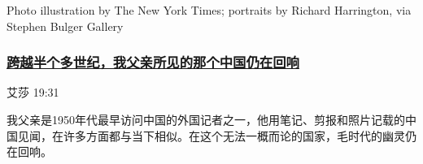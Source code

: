 \href{/china/20200731/china-1950s-echoed-today/}{}

Photo illustration by The New York Times; portraits by Richard
Harrington, via Stephen Bulger Gallery

\hypertarget{ux8de8ux8d8aux534aux4e2aux591aux4e16ux7eaaux6211ux7236ux4eb2ux6240ux89c1ux7684ux90a3ux4e2aux4e2dux56fdux4ecdux5728ux56deux54cd}{%
\subsubsection{\texorpdfstring{\href{/china/20200731/china-1950s-echoed-today/}{跨越半个多世纪，我父亲所见的那个中国仍在回响}}{跨越半个多世纪，我父亲所见的那个中国仍在回响}}\label{ux8de8ux8d8aux534aux4e2aux591aux4e16ux7eaaux6211ux7236ux4eb2ux6240ux89c1ux7684ux90a3ux4e2aux4e2dux56fdux4ecdux5728ux56deux54cd}}

艾莎 19:31

我父亲是1950年代最早访问中国的外国记者之一，他用笔记、剪报和照片记载的中国见闻，在许多方面都与当下相似。在这个无法一概而论的国家，毛时代的幽灵仍在回响。

